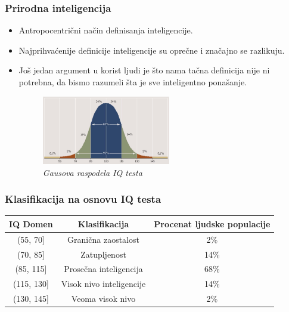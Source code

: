 \documentclass{beamer}
\begin{document}
\begin{frame}[fragile]\frametitle{Prirodna inteligencija}

        \begin{itemize}
        \item Antropocentrični način definisanja inteligencije.
        \item Najprihvaćenije definicije inteligencije su oprečne i značajno se razlikuju.
	\item Još jedan argument u korist ljudi je što nama tačna definicija nije ni potrebna, da bismo razumeli šta je sve inteligentno ponašanje.

        \begin{figure}[h!]
        \centering\includegraphics[height=3cm]{IQ.jpg}
        \caption{\emph{Gausova raspodela IQ testa}}
        \label{fig:raspodelaIQtesta}
    \end{figure}
\end{itemize}
\end{frame}

\begin{frame}[fragile]\frametitle{Klasifikacija na osnovu IQ testa}
\label{tab:tabelaIQ}
\begin{tabular}{|c|c|c|} \hline
IQ Domen & Klasifikacija & Procenat ljudske populacije\\ \hline
(55, 70]& Granična zaostalost & 2\%\\ \hline
(70, 85] & Zatupljenost & 14\%\\ \hline
(85, 115] & Prosečna inteligencija & 68\%\\ \hline
(115, 130] & Visok nivo inteligencije & 14\%\\ \hline
(130, 145] & Veoma visok nivo & 2\% \\ \hline
\end{tabular}

\end{frame}
\end{document}
